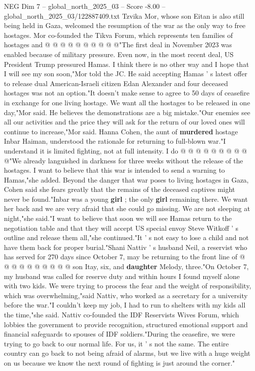 \begin{textsample}{NEG Dim 7 – global\_north\_2025\_03 – Score -8.00 – global\_north\_2025\_03/122887409.txt}
Tzvika Mor, whose son Eitan is also still being held in Gaza, welcomed the resumption of the war as the only way to free hostages.
Mor co-founded the Tikva Forum, which represents ten families of hostages and @ @ @ @ @ @ @ @ @ @"The first deal in November 2023 was enabled because of military pressure.
Even now, in the most recent deal, US President Trump pressured Hamas.
I think there is no other way and I hope that I will see my son soon,"Mor told the JC.
He said accepting Hamas ' s latest offer to release dual American-Israeli citizen Edan Alexander and four deceased hostages was not an option."It doesn't make sense to agree to 50 days of ceasefire in exchange for one living hostage.
We want all the hostages to be released in one day,"Mor said.
He believes the demonstrations are a big mistake."Our enemies see all our activities and the price they will ask for the return of our loved ones will continue to increase,"Mor said.
Hanna Cohen, the aunt of \textbf{murdered} hostage Inbar Haiman, understood the rationale for returning to full-blown war."I understand it is limited fighting, not at full intensity.
I do @ @ @ @ @ @ @ @ @ @"We already languished in darkness for three weeks without the release of the hostages.
I want to believe that this war is intended to send a warning to Hamas,"she added.
Beyond the danger that war poses to living hostages in Gaza, Cohen said she fears greatly that the remains of the deceased captives might never be found."Inbar was a young \textbf{girl} ; the only \textbf{girl} remaining there.
We want her back and we are very afraid that she could go missing.
We are not sleeping at night,"she said."I want to believe that soon we will see Hamas return to the negotiation table and that they will accept US special envoy Steve Witkoff ' s outline and release them all,"she continued."It ' s not easy to lose a child and not have them back for proper burial."Shani Nattiv ' s husband Neil, a reservist who has served for 270 days since October 7, may be returning to the front line of @ @ @ @ @ @ @ @ @ @ son Itay, six, and \textbf{daughter} Melody, three."On October 7, my husband was called for reserve duty and within hours I found myself alone with two kids.
We were trying to process the fear and the weight of responsibility, which was overwhelming,"said Nattiv, who worked as a secretary for a university before the war."I couldn't keep my job, I had to run to shelters with my kids all the time,"she said.
Nattiv co-founded the IDF Reservists Wives Forum, which lobbies the government to provide recognition, structured emotional support and financial safeguards to spouses of IDF soldiers."During the ceasefire, we were trying to go back to our normal life.
For us, it ' s not the same.
The entire country can go back to not being afraid of alarms, but we live with a huge weight on us because we know the next round of fighting is just around the corner."

\end{textsample}
